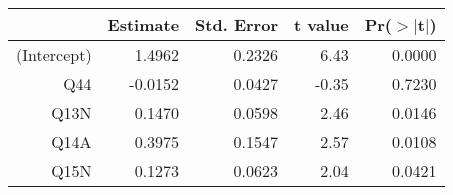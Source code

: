 \begin{table}[ht]
\centering
\begin{tabular}{rrrrr}
  \hline
 & Estimate & Std. Error & t value & Pr($>$$|$t$|$) \\ 
  \hline
(Intercept) & 1.4962 & 0.2326 & 6.43 & 0.0000 \\ 
  Q44 & -0.0152 & 0.0427 & -0.35 & 0.7230 \\ 
  Q13N & 0.1470 & 0.0598 & 2.46 & 0.0146 \\ 
  Q14A & 0.3975 & 0.1547 & 2.57 & 0.0108 \\ 
  Q15N & 0.1273 & 0.0623 & 2.04 & 0.0421 \\ 
   \hline
\end{tabular}
\end{table}
